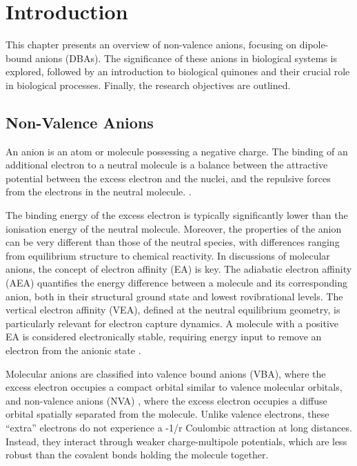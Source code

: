 \chapter{Introduction}\label{ch:introduction}
This chapter presents an overview of non-valence anions, focusing on dipole-bound anions (DBAs). The significance of these anions in biological systems is explored, followed by an introduction to biological quinones and their crucial role in biological processes. Finally, the research objectives are outlined.

\section{Non-Valence Anions}
An anion is an atom or molecule possessing a negative charge. The binding of an additional electron to a neutral molecule is a balance between the attractive potential between the excess electron and the nuclei, and the repulsive forces from the electrons in the neutral molecule.  \cite{simons2008molecular,simons2023molecular,simons2011theoretical,herbert2015quantum}.

The binding energy of the excess electron is typically significantly lower than the ionisation energy of the neutral molecule. Moreover, the properties of the anion can be very different than those of the neutral species, with differences ranging from equilibrium structure to chemical reactivity. In discussions of molecular anions, the concept of electron affinity (EA) is key. The adiabatic electron affinity (AEA) quantifies the energy difference between a molecule and its corresponding anion, both in their structural ground state and lowest rovibrational levels. The vertical electron affinity (VEA), defined at the neutral equilibrium geometry, is particularly relevant for electron capture dynamics. A molecule with a positive EA is considered electronically stable, requiring energy input to remove an electron from the anionic state \cite{simons2008molecular}.

Molecular anions are classified into valence bound anions (VBA), where the excess electron occupies a compact orbital similar to valence molecular orbitals, and non-valence anions (NVA) , where the excess electron occupies a diffuse orbital spatially separated from the molecule. Unlike valence electrons, these ``extra'' electrons do not experience a -1/r Coulombic attraction at long distances. Instead, they interact through weaker charge-multipole potentials, which are less robust than the covalent bonds holding the molecule together\cite{simons2008molecular,herbert2015quantum}.

